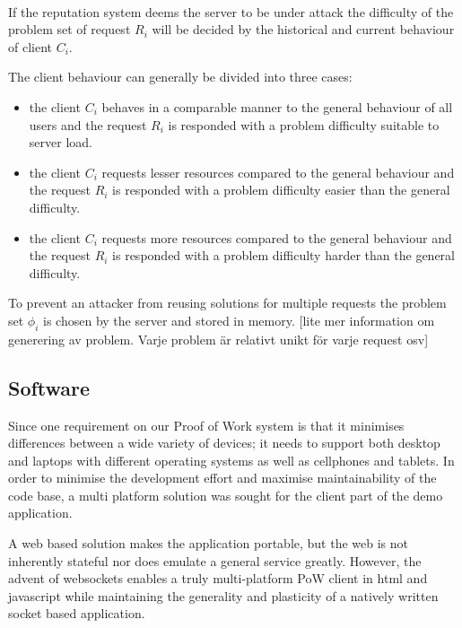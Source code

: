 \\
If the reputation system deems the server to be under attack the difficulty of the problem set of request $R_i$ will be decided by the historical and current behaviour of client $C_i$. 


The client behaviour can generally be divided into three cases:
\begin{itemize}
\item the client $C_i$ behaves in a comparable manner to the general behaviour of all users and the request $R_i$ is responded with a problem difficulty suitable to server load.
\item the client $C_i$ requests lesser resources compared to the general behaviour and the request $R_i$ is responded with a problem difficulty easier than the general difficulty.
\item the client $C_i$ requests more resources compared to the general behaviour and the request $R_i$ is responded with a problem difficulty harder than the general difficulty.
\end{itemize}

To prevent an attacker from reusing solutions for multiple requests the problem set $\phi_i$ is chosen by the server and stored in memory.
[lite mer information om generering av problem. Varje problem är relativt unikt för varje request osv]


\subsection{Software}
Since one requirement on our Proof of Work system is that it minimises differences between a wide variety of devices; it needs to support both desktop and laptops with different operating systems as well as cellphones and tablets.
In order to minimise the development effort and maximise maintainability of the code base, a multi platform solution was sought for the client part of the demo application. 

A web based solution makes the application portable, but the web is not inherently stateful nor does emulate a general service greatly. However, the advent of websockets enables a truly multi-platform PoW client in html and javascript while maintaining the generality and plasticity of a natively written socket based application. 
\begin{comment}
The javascript implementation for handling the protocol is quite simple:
\jscode[firstline=57, firstnumber=57, lastline=84]{../pow.js}
The solution finding part also need to be presented:
\jscode[firstline=26, firstnumber=26, lastline=49]{../pow.js}
To trigger a request to be sent to the server we build the following function which is then registered to the onclick event of a button in the web gui:
\jscode[firstline=100, firstnumber=100, lastline=105]{../pow.js}
\end{comment}

